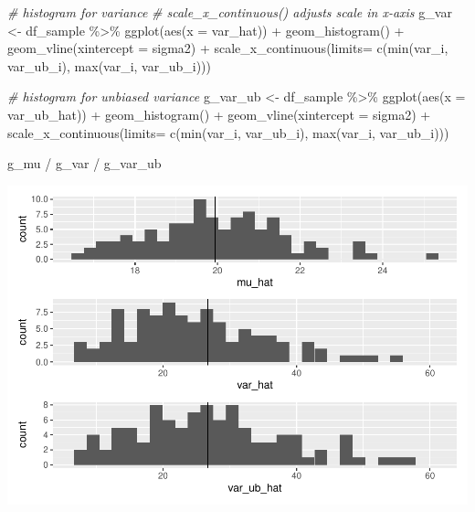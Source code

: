 \documentclass[
]{book}
\newenvironment{Shaded}{\begin{snugshade}}{\end{snugshade}}
\newcommand{\AttributeTok}[1]{\textcolor[rgb]{0.77,0.63,0.00}{#1}}
\newcommand{\CommentTok}[1]{\textcolor[rgb]{0.56,0.35,0.01}{\textit{#1}}}
\newcommand{\FunctionTok}[1]{\textcolor[rgb]{0.00,0.00,0.00}{#1}}
\newcommand{\NormalTok}[1]{#1}
\newcommand{\OtherTok}[1]{\textcolor[rgb]{0.56,0.35,0.01}{#1}}
\newcommand{\SpecialCharTok}[1]{\textcolor[rgb]{0.00,0.00,0.00}{#1}}
\begin{document}
\begin{Shaded}
\begin{Highlighting}[]
\CommentTok{\# histogram for variance}
\CommentTok{\# scale\_x\_continuous() adjusts scale in x{-}axis}
\NormalTok{g\_var }\OtherTok{\textless{}{-}}\NormalTok{ df\_sample }\SpecialCharTok{\%\textgreater{}\%} 
  \FunctionTok{ggplot}\NormalTok{(}\FunctionTok{aes}\NormalTok{(}\AttributeTok{x =}\NormalTok{ var\_hat)) }\SpecialCharTok{+}
  \FunctionTok{geom\_histogram}\NormalTok{() }\SpecialCharTok{+}
  \FunctionTok{geom\_vline}\NormalTok{(}\AttributeTok{xintercept =}\NormalTok{ sigma2) }\SpecialCharTok{+}
  \FunctionTok{scale\_x\_continuous}\NormalTok{(}\AttributeTok{limits=} \FunctionTok{c}\NormalTok{(}\FunctionTok{min}\NormalTok{(var\_i, var\_ub\_i),}
                               \FunctionTok{max}\NormalTok{(var\_i, var\_ub\_i)))}

\CommentTok{\# histogram for unbiased variance}
\NormalTok{g\_var\_ub }\OtherTok{\textless{}{-}}\NormalTok{ df\_sample }\SpecialCharTok{\%\textgreater{}\%} 
  \FunctionTok{ggplot}\NormalTok{(}\FunctionTok{aes}\NormalTok{(}\AttributeTok{x =}\NormalTok{ var\_ub\_hat)) }\SpecialCharTok{+}
  \FunctionTok{geom\_histogram}\NormalTok{() }\SpecialCharTok{+}
  \FunctionTok{geom\_vline}\NormalTok{(}\AttributeTok{xintercept =}\NormalTok{ sigma2) }\SpecialCharTok{+}
  \FunctionTok{scale\_x\_continuous}\NormalTok{(}\AttributeTok{limits=} \FunctionTok{c}\NormalTok{(}\FunctionTok{min}\NormalTok{(var\_i, var\_ub\_i),}
                               \FunctionTok{max}\NormalTok{(var\_i, var\_ub\_i)))}

\NormalTok{g\_mu }\SpecialCharTok{/}\NormalTok{ g\_var }\SpecialCharTok{/}\NormalTok{ g\_var\_ub}
\end{Highlighting}
\end{Shaded}

\begin{center}\includegraphics{_main_files/figure-latex/var-ub-1} \end{center}
\end{document}
